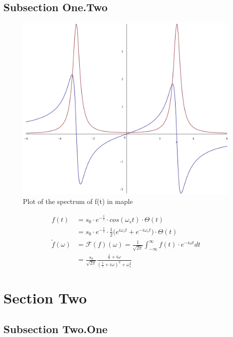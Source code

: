 \subsection{Subsection One.Two}
\lipsum[6]
\begin{figure}[h]
  \centering
  \includegraphics[width=\linewidth]{../img/spectrum}
  \caption{Plot of the spectrum of f(t) in maple}
  \label{img:spectrum}
\end{figure}

\begin{align}
    f(t) &= s_0 \cdot e^{-\frac{t}{\tau}} \cdot cos(\omega_s t) \cdot \Theta(t) \nonumber \\
    &= s_0 \cdot e^{-\frac{t}{\tau}} \cdot \frac{1}{2} \Big( e^{i \omega_s t} + e^{-i \omega_s t} \Big) \cdot \Theta(t)\\
    \tilde{f}(\omega) &= \mathcal{F}(f)(\omega) = \frac{1}{\sqrt{2\pi}} \int_{-\infty}^{\infty} f(t) \cdot e^{-i \omega t} dt \nonumber\\
    &= \frac{s_0}{\sqrt{2\pi}} \frac{\frac{1}{\tau} + i \omega}{(\frac{1}{\tau} + i \omega)^2 + \omega_s^2}
\end{align}

\section{Section Two}
\lipsum[9-12]

\subsection{Subsection Two.One}
\lipsum[13-14]
